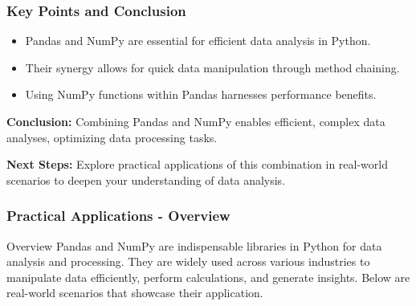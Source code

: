\documentclass[aspectratio=169]{beamer}
\begin{document}
\begin{frame}[fragile]
    \frametitle{Key Points and Conclusion}
    \begin{itemize}
        \item Pandas and NumPy are essential for efficient data analysis in Python.
        \item Their synergy allows for quick data manipulation through method chaining.
        \item Using NumPy functions within Pandas harnesses performance benefits.
    \end{itemize}
    
    \textbf{Conclusion:} Combining Pandas and NumPy enables efficient, complex data analyses, optimizing data processing tasks.
    
    \textbf{Next Steps:} Explore practical applications of this combination in real-world scenarios to deepen your understanding of data analysis.
\end{frame}

\begin{frame}[fragile]
    \frametitle{Practical Applications - Overview}
    \begin{block}{Overview}
        Pandas and NumPy are indispensable libraries in Python for data analysis and processing.
        They are widely used across various industries to manipulate data efficiently,
        perform calculations, and generate insights. Below are real-world scenarios that showcase their application.
    \end{block}
\end{frame}
\end{document}

